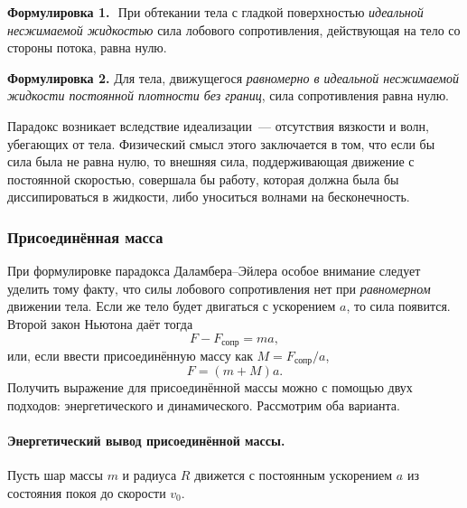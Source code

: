 \vskip 0.25cm
\textbf{Формулировка 1.\,\, }{При обтекании тела с гладкой поверхностью \textit{идеальной несжимаемой
    жидкостью} сила лобового сопротивления, действующая на тело со
стороны потока, равна нулю.}

\vskip 0.25cm
\textbf{Формулировка 2. }{Для тела, движущегося \textit{равномерно в идеальной несжимаемой
    жидкости постоянной плотности без границ}, сила сопротивления
равна нулю.}
\vskip 0.25cm

Парадокс возникает вследствие идеализации~--- отсутствия вязкости и волн, убегающих от тела.
Физический смысл этого заключается в том, что если бы сила была не равна нулю, то внешняя сила, поддерживающая движение с постоянной скоростью, совершала бы работу, которая должна была бы диссипироваться в жидкости, либо уноситься волнами на бесконечность.


\subsubsection{Присоединённая масса}

При формулировке парадокса Даламбера--Эйлера особое внимание следует уделить тому факту, что силы лобового сопротивления нет при \textit{равномерном} движении тела. Если же тело будет двигаться с ускорением $a$, то сила появится. Второй закон Ньютона даёт тогда
\begin{equation}
	F-F_\text{сопр} = ma,
\end{equation}
или, если ввести присоединённую массу как $M = F_\text{сопр}/a$,
\begin{equation}
	F = (m+M)a.
\end{equation}
Получить выражение для присоединённой массы можно с помощью двух подходов: энергетического и динамического. Рассмотрим оба варианта.

\paragraph{Энергетический вывод присоединённой массы. } Пусть шар массы
$m$ и радиуса $R$ движется с постоянным ускорением $a$ из состояния
покоя до скорости $v_0$.

